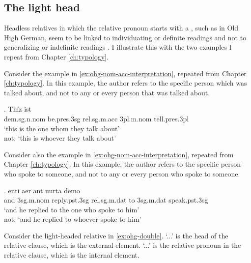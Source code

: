 \subsection{The light head}

Headless relatives in which the relative pronoun starts with a , such as in Old High German, seem to be linked to individuating or definite readings and not to generalizing or indefinite readings \citep[cf.][]{fuss2017}. I illustrate this with the two examples I repeat from Chapter  \ref{ch:typology}.

Consider the example in \ref{ex:ohg-nom-acc-interpretation}, repeated from Chapter \ref{ch:typology}.
In this example, the author refers to the specific person which was talked about, and not to any or every person that was talked about.

\exg. Thíz ist   \\
\ac{dem}.\ac{sg}.\ac{n}.\ac{nom} be.\ac{pres}.3\ac{sg}\scsub{[nom]} \ac{rel}.\ac{sg}.\ac{m}.\ac{acc}
3\ac{pl}.\ac{m}.\ac{nom} tell.\ac{pres}.3\ac{pl}\scsub{[acc]}\\
`this is the one whom they talk about'\\
not: `this is whoever they talk about' \label{ex:ohg-nom-acc-interpretation}

Consider also the example in \ref{ex:ohg-nom-acc-interpretation}, repeated from Chapter \ref{ch:typology}.
In this example, the author refers to the specific person who spoke to someone, and not to any or every person who spoke to someone.

\exg. enti aer {ant uurta} demo  \\
and 3\ac{sg}.\ac{m}.\ac{nom} reply.\ac{pst}.3\ac{sg}\scsub{[dat]} \ac{rel}.\ac{sg}.\ac{m}.\ac{dat} {to 3\ac{sg}.\ac{m}.\ac{dat}} speak.\ac{pst}.3\ac{sg}\scsub{[nom]}\\
`and he replied to the one who spoke to him'\\
not: `and he replied to whoever spoke to him'
 \label{ex:ohg-dat-nom-rep}

 Consider the light-headed relative in \ref{ex:ohg-double}.  `...' is the head of the relative clause, which is the external element.  `...' is the relative pronoun in the relative clause, which is the internal element.


